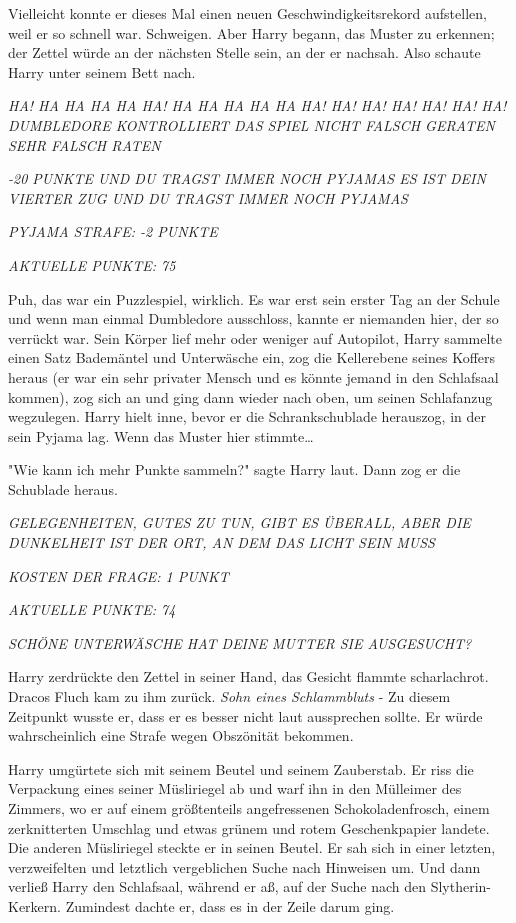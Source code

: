 {Vielleicht konnte er dieses Mal einen neuen Geschwindigkeitsrekord aufstellen, weil er so schnell war. Schweigen. Aber Harry begann, das Muster zu erkennen; der Zettel würde an der nächsten Stelle sein, an der er nachsah. Also schaute Harry unter seinem Bett nach.

\emph{HA! HA HA HA HA HA! HA HA HA HA HA HA! HA! HA! HA! HA! HA! HA! DUMBLEDORE KONTROLLIERT DAS SPIEL NICHT FALSCH GERATEN SEHR FALSCH RATEN}

\emph{-20 PUNKTE UND DU TRAGST IMMER NOCH PYJAMAS ES IST DEIN VIERTER ZUG UND DU TRAGST IMMER NOCH PYJAMAS}

\emph{PYJAMA STRAFE: -2 PUNKTE}

\emph{AKTUELLE PUNKTE: 75}

Puh, das war ein Puzzlespiel, wirklich. Es war erst sein erster Tag an der Schule und wenn man einmal Dumbledore ausschloss, kannte er niemanden hier, der so verrückt war. Sein Körper lief mehr oder weniger auf Autopilot, Harry sammelte einen Satz Bademäntel und Unterwäsche ein, zog die Kellerebene seines Koffers heraus (er war ein sehr privater Mensch und es könnte jemand in den Schlafsaal kommen), zog sich an und ging dann wieder nach oben, um seinen Schlafanzug wegzulegen. Harry hielt inne, bevor er die Schrankschublade herauszog, in der sein Pyjama lag. Wenn das Muster hier stimmte…

"Wie kann ich mehr Punkte sammeln?" sagte Harry laut. Dann zog er die Schublade heraus.

\emph{GELEGENHEITEN, GUTES ZU TUN, GIBT ES ÜBERALL, ABER DIE DUNKELHEIT IST DER ORT, AN DEM DAS LICHT SEIN MUSS}

\emph{KOSTEN DER FRAGE: 1 PUNKT}

\emph{AKTUELLE PUNKTE: 74}

\emph{SCHÖNE UNTERWÄSCHE HAT DEINE MUTTER SIE AUSGESUCHT?}

Harry zerdrückte den Zettel in seiner Hand, das Gesicht flammte scharlachrot. Dracos Fluch kam zu ihm zurück. \emph{Sohn eines Schlammbluts} - Zu diesem Zeitpunkt wusste er, dass er es besser nicht laut aussprechen sollte. Er würde wahrscheinlich eine Strafe wegen Obszönität bekommen.

Harry umgürtete sich mit seinem Beutel und seinem Zauberstab. Er riss die Verpackung eines seiner Müsliriegel ab und warf ihn in den Mülleimer des Zimmers, wo er auf einem größtenteils angefressenen Schokoladenfrosch, einem zerknitterten Umschlag und etwas grünem und rotem Geschenkpapier landete. Die anderen Müsliriegel steckte er in seinen Beutel. Er sah sich in einer letzten, verzweifelten und letztlich vergeblichen Suche nach Hinweisen um. Und dann verließ Harry den Schlafsaal, während er aß, auf der Suche nach den Slytherin-Kerkern. Zumindest dachte er, dass es in der Zeile darum ging.

}
